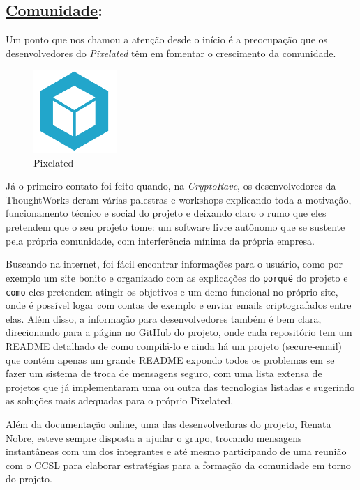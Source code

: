 \subsection*{\underline{Comunidade}:}

Um ponto que nos chamou a atenção desde o início é a preocupação que os
desenvolvedores do \emph{Pixelated} têm em fomentar o crescimento da comunidade.

\begin{figure} %
\begin{center}
\includegraphics[width=0.28\textwidth]{src/pixelated-logo.png}
\caption*{Pixelated}
\end{center}
\end{figure}

Já o primeiro contato foi feito quando, na \emph{CryptoRave}, os desenvolvedores
da
ThoughtWorks deram várias palestras e workshops explicando toda a motivação,
funcionamento técnico e social do projeto e deixando claro o rumo que eles
pretendem que o seu projeto tome: um software livre autônomo que se sustente
pela
própria comunidade, com interferência mínima da própria empresa.

Buscando na internet, foi fácil encontrar informações para o usuário, como por
exemplo
um site bonito e organizado com as explicações do \texttt{porquê} do projeto e
\texttt{como} eles pretendem atingir os objetivos e um demo funcional no próprio
site, onde é possível logar com contas de exemplo e enviar emails
criptografados entre elas.
Além disso, a informação para desenvolvedores também é bem clara, direcionando
para a página no GitHub do projeto, onde cada repositório tem um README detalhado
de como compilá-lo e ainda há um projeto (secure-email) que contém apenas um
grande README expondo todos os problemas em se fazer um sistema de troca de
mensagens seguro, com uma lista extensa de projetos que já implementaram uma ou
outra das tecnologias listadas e sugerindo as soluções mais adequadas para o
próprio Pixelated.

Além da documentação online, uma das desenvolvedoras do projeto,
\href{https://github.com/re-nobre}{Renata Nobre},
esteve sempre disposta a ajudar o grupo, trocando mensagens instantâneas com um
dos integrantes e até mesmo participando de uma reunião com o CCSL para elaborar
estratégias para a formação da comunidade em torno do projeto.

